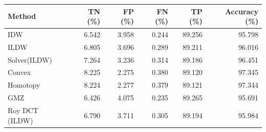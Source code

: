 \begin{tabular}{lrrrrr}\toprule
Method & TN (\%) & FP (\%) & FN (\%) & TP (\%) & Accuracy (\%) \\ \midrule
IDW & 6.542 & 3.958 & 0.244 & 89.256 & 95.798 \\
ILDW & 6.805 & 3.696 & 0.289 & 89.211 & 96.016 \\
Solver(ILDW) & 7.264 & 3.236 & 0.314 & 89.186 & 96.451 \\
Convex & 8.225 & 2.275 & 0.380 & 89.120 & 97.345 \\
Homotopy & 8.224 & 2.277 & 0.379 & 89.121 & 97.344 \\
GMZ & 6.426 & 4.075 & 0.235 & 89.265 & 95.691 \\
Roy DCT (ILDW) & 6.790 & 3.711 & 0.305 & 89.194 & 95.984 \\
\bottomrule\end{tabular}
